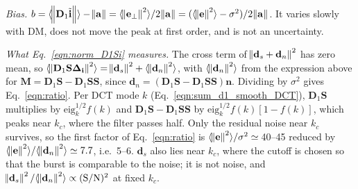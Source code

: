 \documentclass[twocolumn]{aastex631}
\begin{document}
\textit{Bias.} $b=\langle\norm{\mathbf{D}_1\tilde{\mathbf{i}}}\rangle-\norm{\mathbf{a}}=\langle\norm{\mathbf{e}_\perp}^2\rangle/2\norm{\mathbf{a}}=(\langle\norm{\mathbf{e}}^2\rangle-\sigma^2)/2\norm{\mathbf{a}}$. It varies slowly with DM, does not move the peak at first order, and is not an uncertainty.

\textit{What Eq.~\eqref{eqn:norm_D1Si} measures.} The cross term of $\norm{\mathbf{d}_s+\mathbf{d}_n}^2$ has zero mean, so $\langle\norm{\mathbf{D}_1\mathbf{S}\mathbf{\Delta_i}}^2\rangle=\norm{\mathbf{d}_s}^2+\langle\norm{\mathbf{d}_n}^2\rangle$, with $\langle\norm{\mathbf{d}_n}^2\rangle$ from the expression above for $\mathbf{M}=\mathbf{D}_1\mathbf{S}-\mathbf{D}_1\mathbf{S}\mathbf{S}$, since $\mathbf{d}_n=(\mathbf{D}_1\mathbf{S}-\mathbf{D}_1\mathbf{S}\mathbf{S})\mathbf{n}$. Dividing by $\sigma^2$ gives Eq.~\eqref{eqn:ratio}. Per DCT mode $k$ (Eq.~\ref{eqn:sum_d1_smooth_DCT}), $\mathbf{D}_1\mathbf{S}$ multiplies by $\text{eig}_k^{1/2}f(k)$ and $\mathbf{D}_1\mathbf{S}-\mathbf{D}_1\mathbf{S}\mathbf{S}$ by $\text{eig}_k^{1/2}f(k)[1-f(k)]$, which peaks near $k_c$, where the filter passes half. Only the residual noise near $k_c$ survives, so the first factor of Eq.~\eqref{eqn:ratio} is $\langle\norm{\mathbf{e}}^2\rangle/\sigma^2\simeq$\,40--45 reduced by $\langle\norm{\mathbf{e}}^2\rangle/\langle\norm{\mathbf{d}_n}^2\rangle\simeq7.7$, i.e.\ 5--6. $\mathbf{d}_s$ also lies near $k_c$, where the cutoff is chosen so that the burst is comparable to the noise; it is not noise, and $\norm{\mathbf{d}_s}^2/\langle\norm{\mathbf{d}_n}^2\rangle\propto({\rm S/N})^2$ at fixed $k_c$.
\end{document}
